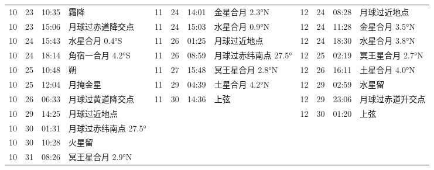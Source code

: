 \begin{tabular}{llll|llll|llll}
10 & 23 & 10:35 & 霜降 & 11 & 24 & 14:01 & 金星合月 2.3°N & 12 & 24 & 08:28 & 月球过近地点 \tabularnewline
10 & 23 & 15:06 & 月球过赤道降交点 & 11 & 24 & 15:03 & 水星合月 0.9°N & 12 & 24 & 11:28 & 金星合月 3.5°N \tabularnewline
10 & 24 & 15:43 & 水星合月 0.4°S & 11 & 26 & 01:25 & 月球过近地点 & 12 & 24 & 18:30 & 水星合月 3.8°N \tabularnewline
10 & 24 & 18:14 & 角宿一合月 4.2°S & 11 & 26 & 08:59 & 月球过赤纬南点 27.5° & 12 & 25 & 02:19 & 冥王星合月 2.7°N \tabularnewline
10 & 25 & 10:48 & 朔 & 11 & 27 & 15:48 & 冥王星合月 2.8°N & 12 & 26 & 16:11 & 土星合月 4.0°N \tabularnewline
10 & 25 & 12:04 & 月掩金星 & 11 & 29 & 04:39 & 土星合月 4.2°N & 12 & 29 & 02:59 & 水星留 \tabularnewline
10 & 26 & 06:33 & 月球过黄道降交点 & 11 & 30 & 14:36 & 上弦 & 12 & 29 & 23:06 & 月球过赤道升交点 \tabularnewline
10 & 29 & 14:25 & 月球过近地点 &  &  &  &  & 12 & 30 & 01:20 & 上弦 \tabularnewline
10 & 30 & 01:31 & 月球过赤纬南点 27.5° &  &  &  &  &  &  &  &  \tabularnewline
10 & 30 & 10:28 & 火星留 &  &  &  &  &  &  &  &  \tabularnewline
10 & 31 & 08:26 & 冥王星合月 2.9°N &  &  &  &  &  &  &  &  \tabularnewline
\hline \end{tabular}

